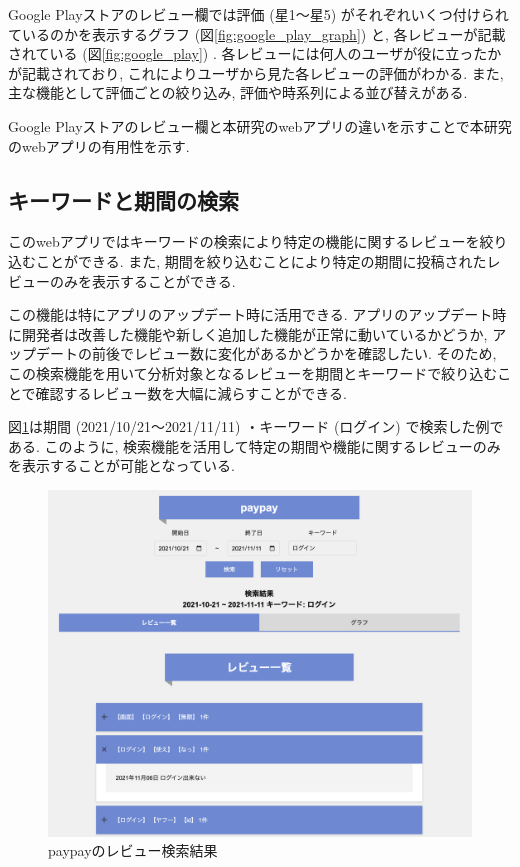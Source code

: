 Google Playストアのレビュー欄では評価 (星1〜星5) がそれぞれいくつ付けられているのかを表示するグラフ (図\ref{fig:google_play_graph}) と, 各レビューが記載されている (図\ref{fig:google_play}) . 各レビューには何人のユーザが役に立ったかが記載されており, これによりユーザから見た各レビューの評価がわかる. 
また, 主な機能として評価ごとの絞り込み, 評価や時系列による並び替えがある. 

Google Playストアのレビュー欄と本研究のwebアプリの違いを示すことで本研究のwebアプリの有用性を示す. 

\subsection{キーワードと期間の検索}
このwebアプリではキーワードの検索により特定の機能に関するレビューを絞り込むことができる. また, 期間を絞り込むことにより特定の期間に投稿されたレビューのみを表示することができる.  

この機能は特にアプリのアップデート時に活用できる. アプリのアップデート時に開発者は改善した機能や新しく追加した機能が正常に動いているかどうか, アップデートの前後でレビュー数に変化があるかどうかを確認したい. そのため, この検索機能を用いて分析対象となるレビューを期間とキーワードで絞り込むことで確認するレビュー数を大幅に減らすことができる. 

図\ref{fig:paypay_search}は期間 (2021/10/21〜2021/11/11) ・キーワード (ログイン) で検索した例である. このように, 検索機能を活用して特定の期間や機能に関するレビューのみを表示することが可能となっている. 
\begin{figure}[H]
  \centering
  \includegraphics[scale=0.3]
    {contents/images/paypay_search.png}
  \caption{paypayのレビュー検索結果\label{fig:paypay_search}}
\end{figure}

